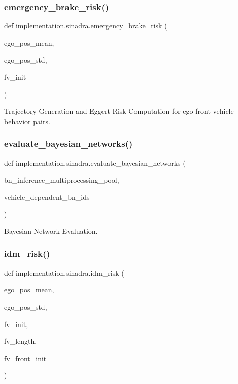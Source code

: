 \subsubsection{\texorpdfstring{emergency\+\_\+brake\+\_\+risk()}{emergency\_brake\_risk()}}
{\footnotesize\ttfamily def implementation.\+sinadra.\+emergency\+\_\+brake\+\_\+risk (\begin{DoxyParamCaption}\item[{}]{ego\+\_\+pos\+\_\+mean,  }\item[{}]{ego\+\_\+pos\+\_\+std,  }\item[{}]{fv\+\_\+init }\end{DoxyParamCaption})}



Trajectory Generation and Eggert Risk Computation for ego-\/front vehicle behavior pairs. 

\mbox{\label{namespaceimplementation_1_1sinadra_a9c99c51967919cb8364efccda48af70d}} 
\subsubsection{\texorpdfstring{evaluate\+\_\+bayesian\+\_\+networks()}{evaluate\_bayesian\_networks()}}
{\footnotesize\ttfamily def implementation.\+sinadra.\+evaluate\+\_\+bayesian\+\_\+networks (\begin{DoxyParamCaption}\item[{}]{bn\+\_\+inference\+\_\+multiprocessing\+\_\+pool,  }\item[{}]{vehicle\+\_\+dependent\+\_\+bn\+\_\+ids }\end{DoxyParamCaption})}



Bayesian Network Evaluation. 

\mbox{\label{namespaceimplementation_1_1sinadra_a28170a6db73e1acb09f5948771730bc4}} 
\subsubsection{\texorpdfstring{idm\+\_\+risk()}{idm\_risk()}}
{\footnotesize\ttfamily def implementation.\+sinadra.\+idm\+\_\+risk (\begin{DoxyParamCaption}\item[{}]{ego\+\_\+pos\+\_\+mean,  }\item[{}]{ego\+\_\+pos\+\_\+std,  }\item[{}]{fv\+\_\+init,  }\item[{}]{fv\+\_\+length,  }\item[{}]{fv\+\_\+front\+\_\+init }\end{DoxyParamCaption})}

